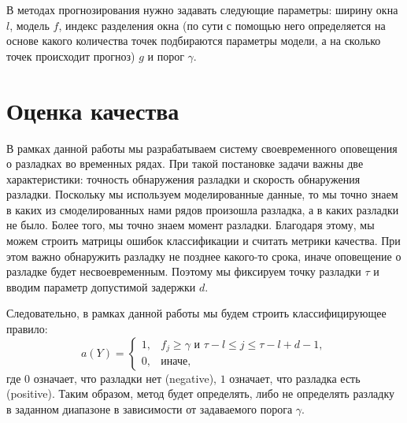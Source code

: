 \documentclass[%
12pt,
master,  %
natbib,      %
subf,        %
substylefile = spbu.rtx,
href,        %
colorlinks,  %
]{disser}
\begin{document}
В методах прогнозирования нужно задавать следующие параметры: ширину окна $l$, модель $f$, индекс разделения окна (по сути с помощью него определяется на основе какого количества точек подбираются параметры модели, а на сколько точек происходит прогноз) $g$ и порог $\gamma$.


\section{Оценка качества}

В рамках данной работы мы разрабатываем систему своевременного оповещения о разладках во временных рядах. При такой постановке задачи важны две характеристики: точность обнаружения разладки и скорость обнаружения разладки. Поскольку мы используем моделированные данные, то мы точно знаем в каких из смоделированных нами рядов произошла разладка, а в каких разладки не было. Более того, мы точно знаем момент разладки. Благодаря этому, мы можем строить матрицы ошибок классификации и считать метрики качества. При этом важно обнаружить разладку не позднее какого-то срока, иначе оповещение о разладке будет несвоевременным. Поэтому мы фиксируем точку разладки $\tau$ и вводим параметр допустимой задержки $d$.


Следовательно, в рамках данной работы мы будем строить классифицирующее правило:
\begin{equation*}
a(Y) = 
	\begin{cases}
		1, & f_j \geq \gamma \text{ и } \tau-l \leq j \leq \tau-l+d-1, \\
		0, & \text{иначе},
	\end{cases}
\end{equation*}
где $0$ означает, что разладки нет (negative), $1$ означает, что разладка есть (positive).
Таким образом, метод будет определять, либо не определять разладку в заданном диапазоне в зависимости от задаваемого порога $\gamma$.
\end{document}
